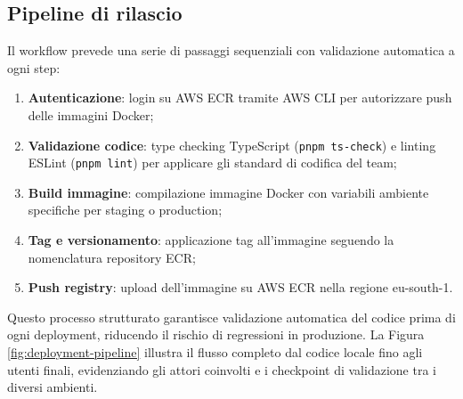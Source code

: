\subsection{Pipeline di rilascio}

Il workflow prevede una serie di passaggi sequenziali con validazione automatica 
a ogni step:

\begin{enumerate}
  \item \textbf{Autenticazione}: login su AWS ECR tramite AWS CLI per autorizzare 
        push delle immagini Docker;
  \item \textbf{Validazione codice}: type checking TypeScript (\texttt{pnpm ts-check}) 
        e linting ESLint (\texttt{pnpm lint}) per applicare gli standard di codifica del team;
  \item \textbf{Build immagine}: compilazione immagine Docker con variabili 
        ambiente specifiche per staging o production;
  \item \textbf{Tag e versionamento}: applicazione tag all'immagine seguendo 
        la nomenclatura repository ECR;
  \item \textbf{Push registry}: upload dell'immagine su AWS ECR nella regione eu-south-1.
\end{enumerate}

Questo processo strutturato garantisce validazione automatica del codice prima 
di ogni deployment, riducendo il rischio di regressioni in produzione. La Figura 
\ref{fig:deployment-pipeline} illustra il flusso completo dal codice locale fino 
agli utenti finali, evidenziando gli attori coinvolti e i checkpoint di validazione 
tra i diversi ambienti.

